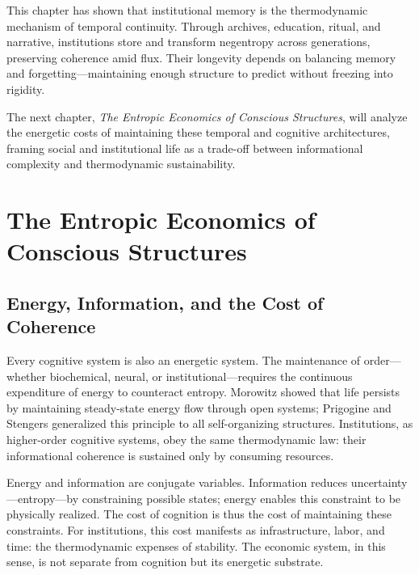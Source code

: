 \documentclass[11pt,a4paper]{article}
\begin{document}
This chapter has shown that institutional memory is the thermodynamic mechanism of temporal continuity.  Through archives, education, ritual, and narrative, institutions store and transform negentropy across generations, preserving coherence amid flux.  Their longevity depends on balancing memory and forgetting—maintaining enough structure to predict without freezing into rigidity.  

The next chapter, \textit{The Entropic Economics of Conscious Structures}, will analyze the energetic costs of maintaining these temporal and cognitive architectures, framing social and institutional life as a trade-off between informational complexity and thermodynamic sustainability.


\section{The Entropic Economics of Conscious Structures}
\label{sec:entropic-economics}

\subsection{Energy, Information, and the Cost of Coherence}

Every cognitive system is also an energetic system.  The maintenance of order—whether biochemical, neural, or institutional—requires the continuous expenditure of energy to counteract entropy.  Morowitz \citep{Morowitz1968EnergyFlowBiology} showed that life persists by maintaining steady-state energy flow through open systems; Prigogine and Stengers \citep{Prigogine1977SelfOrganizationNonequilibrium} generalized this principle to all self-organizing structures.  Institutions, as higher-order cognitive systems, obey the same thermodynamic law: their informational coherence is sustained only by consuming resources.

Energy and information are conjugate variables.  Information reduces uncertainty—entropy—by constraining possible states; energy enables this constraint to be physically realized.  The cost of cognition is thus the cost of maintaining these constraints.  For institutions, this cost manifests as infrastructure, labor, and time: the thermodynamic expenses of stability.  The economic system, in this sense, is not separate from cognition but its energetic substrate.
\end{document}
